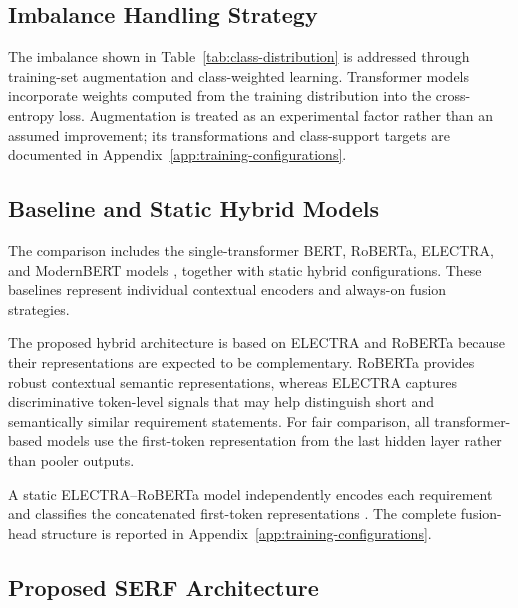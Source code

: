 \documentclass[runningheads]{llncs}
\begin{document}
\newpage
\subsection{Imbalance Handling Strategy}\label{sec:imbalance-handling}

The imbalance shown in Table~\ref{tab:class-distribution} is addressed through training-set augmentation and class-weighted learning. Transformer models incorporate weights computed from the training distribution into the cross-entropy loss. Augmentation is treated as an experimental factor rather than an assumed improvement; its transformations and class-support targets are documented in Appendix~\ref{app:training-configurations}.

\subsection{Baseline and Static Hybrid Models}\label{sec:baselines}

The comparison includes the single-transformer BERT, RoBERTa, ELECTRA, and ModernBERT models \cite{devlin_bert,liu_roberta,clark_electra}, together with static hybrid configurations. These baselines represent individual contextual encoders and always-on fusion strategies.

The proposed hybrid architecture is based on ELECTRA and RoBERTa because their representations are expected to be complementary. RoBERTa provides robust contextual semantic representations, whereas ELECTRA captures discriminative token-level signals that may help distinguish short and semantically similar requirement statements. For fair comparison, all transformer-based models use the first-token representation from the last hidden layer rather than pooler outputs. 

A static ELECTRA--RoBERTa model independently encodes each requirement and classifies the concatenated first-token representations \cite{said_functional_nonfunctional}. The complete fusion-head structure is reported in Appendix~\ref{app:training-configurations}.

\subsection{Proposed SERF Architecture}\label{sec:serf-architecture}
\end{document}
